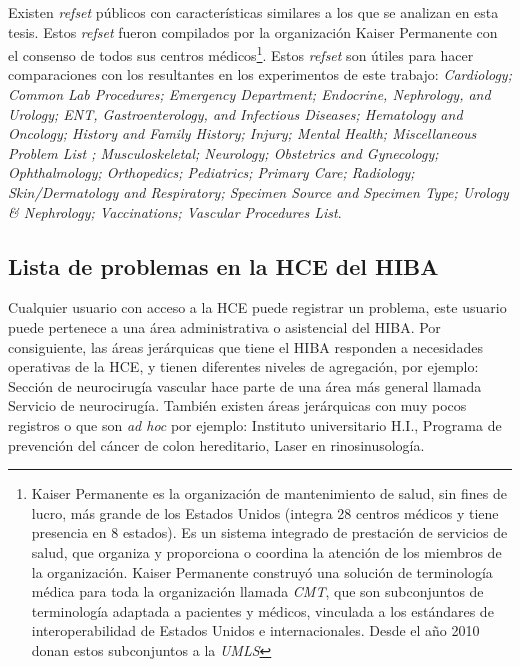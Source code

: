 Existen \textit{\acrshort{refset}} públicos con características similares a los que se analizan en esta tesis. Estos \textit{\acrshort{refset}} fueron compilados por la organización Kaiser Permanente\label{par:kaiser-permanente} con el consenso de todos sus centros médicos\footnote{Kaiser Permanente es la organización de mantenimiento de salud, sin fines de lucro, más grande de los Estados Unidos (integra 28 centros médicos y tiene presencia en 8 estados). Es un sistema integrado de prestación de servicios de salud, que organiza y proporciona o coordina la atención de los miembros de la organización. Kaiser Permanente construyó una solución de terminología médica para toda la organización llamada \textit{\acrfull{CMT}}, que son subconjuntos de terminología adaptada a pacientes y médicos, vinculada a los estándares de interoperabilidad de Estados Unidos e internacionales. Desde el año 2010 donan estos subconjuntos a la \textit{\acrfull{UMLS}}
}. Estos  \textit{\acrshort{refset}} son útiles para hacer comparaciones con los resultantes en los experimentos de este trabajo: \textit{Cardiology; Common Lab Procedures; Emergency Department; Endocrine,  Nephrology, and Urology; ENT, Gastroenterology, and Infectious Diseases; Hematology and Oncology; History and Family History; Injury; Mental Health; Miscellaneous Problem List ; Musculoskeletal; Neurology; Obstetrics and Gynecology; Ophthalmology; Orthopedics; Pediatrics; Primary Care; Radiology; Skin/Dermatology and Respiratory; Specimen Source and Specimen Type; Urology \& Nephrology; Vaccinations; Vascular Procedures List}.


\subsection{Lista de problemas en la \acrshort{HCE} del \acrshort{HIBA} }
\label{par:listaproblemas-HCE}
Cualquier usuario con acceso a la \acrshort{HCE} puede registrar un problema, este usuario puede pertenece a una área administrativa o asistencial del \acrshort{HIBA}. Por consiguiente, las áreas jerárquicas que tiene el \acrshort{HIBA} responden a necesidades operativas de la \acrshort{HCE}, y tienen diferentes niveles de agregación, por ejemplo: Sección de neurocirugía vascular hace parte de una área más general llamada Servicio de neurocirugía. También existen áreas jerárquicas con muy pocos registros o que son \textit{ad hoc} por ejemplo: Instituto universitario H.I., Programa de prevención del cáncer de colon hereditario, Laser en rinosinusología.

